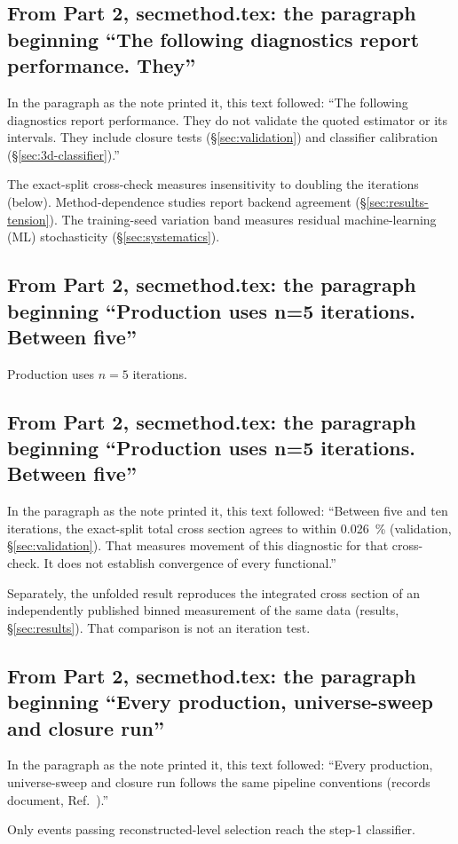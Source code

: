 \subsection{From Part 2, secmethod.tex: the paragraph beginning ``The following diagnostics report performance. They''}
In the paragraph as the note printed it, this text followed: ``The following diagnostics report performance. They do not validate the quoted estimator or its intervals. They include closure tests (\S\ref{sec:validation}) and classifier calibration (\S\ref{sec:3d-classifier}).''\par
The exact-split cross-check measures insensitivity to doubling the iterations (below). Method-dependence studies report backend agreement (\S\ref{sec:results-tension}). The training-seed variation band measures residual machine-learning (ML) stochasticity (\S\ref{sec:systematics}).

\subsection{From Part 2, secmethod.tex: the paragraph beginning ``Production uses n=5 iterations. Between five''}
Production uses $n=5$ iterations.

\subsection{From Part 2, secmethod.tex: the paragraph beginning ``Production uses n=5 iterations. Between five''}
In the paragraph as the note printed it, this text followed: ``Between five and ten iterations, the exact-split total cross section agrees to within \SI{0.026}{\percent} (validation, \S\ref{sec:validation}). That measures movement of this diagnostic for that cross-check. It does not establish convergence of every functional.''\par
Separately, the unfolded result reproduces the integrated cross section of an independently published binned measurement of the same data (results, \S\ref{sec:results}). That comparison is not an iteration test.

\subsection{From Part 2, secmethod.tex: the paragraph beginning ``Every production, universe-sweep and closure run''}
In the paragraph as the note printed it, this text followed: ``Every production, universe-sweep and closure run follows the same pipeline conventions (records document, Ref.~\cite{NoteRecords2026}).''\par
Only events passing reconstructed-level selection reach the step-1 classifier.

